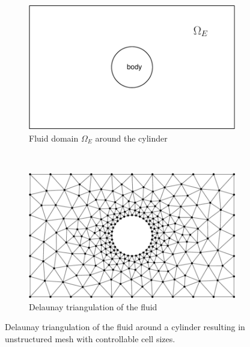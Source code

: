 \begin{figure}[t]
        \centering
        \begin{subfigure}[b]{0.5\textwidth}
                \includegraphics[width=\textwidth]{figures/eulerian/cylinderPreDelauney-crop.pdf}
                \caption{Fluid domain $\Omega_E$ around the cylinder}
                \label{fig:cylinderPreDelauney}
        \end{subfigure}%
        ~ %
        \begin{subfigure}[b]{0.5\textwidth}
                \includegraphics[width=\textwidth]{figures/eulerian/cylinderDelauney-crop.pdf}
                \caption{Delaunay triangulation of the fluid}
                \label{fig:cylinderDelauney}
        \end{subfigure}
        \caption{Delaunay triangulation of the fluid around a cylinder resulting in unstructured mesh with controllable cell sizes.}
        \label{fig:cylinderFiniteElementDiscretization}
\end{figure}	

